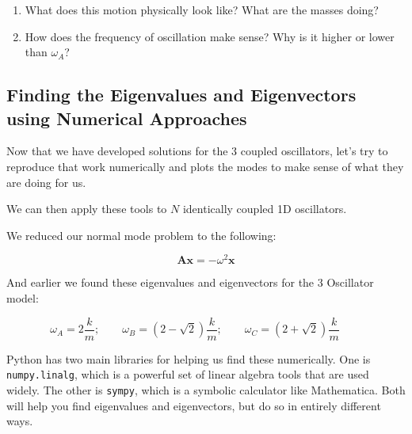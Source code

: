 \begin{enumerate}
\def\labelenumi{\arabic{enumi}.}
\tightlist
\item
  What does this motion physically look like? What are the masses doing?
\item
  How does the frequency of oscillation make sense? Why is it higher or
  lower than \(\omega_A\)?
\end{enumerate}

\subsection{Finding the Eigenvalues and Eigenvectors using Numerical
Approaches}\label{finding-the-eigenvalues-and-eigenvectors-using-numerical-approaches}

Now that we have developed solutions for the 3 coupled oscillators,
let's try to reproduce that work numerically and plots the modes to make
sense of what they are doing for us.

We can then apply these tools to \(N\) identically coupled 1D
oscillators.

\begin{Shaded}
\begin{Highlighting}[]
 \OperatorTok{*} 
\OperatorTok{=}\NormalTok{)  }
\end{Highlighting}
\end{Shaded}

We reduced our normal mode problem to the following:

\[\mathbf{A}\mathbf{x} = -\omega^2\mathbf{x}\]

And earlier we found these eigenvalues and eigenvectors for the 3
Oscillator model:

\[\omega_A = 2\dfrac{k}{m}; \qquad \omega_B = \left(2-\sqrt{2}\right)\dfrac{k}{m}; \qquad \omega_C = \left(2+\sqrt{2}\right)\dfrac{k}{m}\qquad\]

Python has two main libraries for helping us find these numerically. One
is \texttt{numpy.linalg}, which is a powerful set of linear algebra
tools that are used widely. The other is \texttt{sympy}, which is a
symbolic calculator like Mathematica. Both will help you find
eigenvalues and eigenvectors, but do so in entirely different ways.


